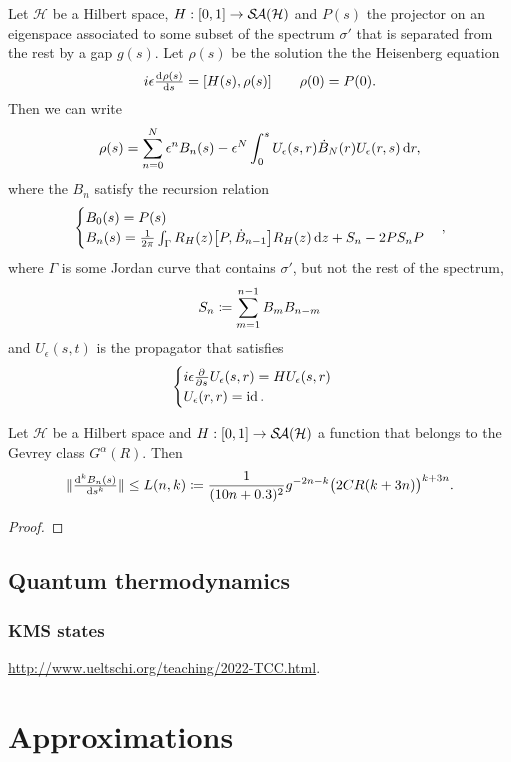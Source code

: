 \begin{proposition}
Let $\mathcal{H}$ be a Hilbert space, $H: \interval{0,1}\to \SelfAdjoints(\mathcal{H})$ and $P(s)$ the projector on an eigenspace associated to some subset of the spectrum $\sigma'$ that is separated from the rest by a gap $g(s)$. Let $\rho(s)$ be the solution the the Heisenberg equation
\[ i\epsilon \od{\rho(s)}{s} = [H(s), \rho(s)] \qquad \rho(0)= P(0). \]
Then we can write
\[ \rho(s) = \sum_{n=0}^N \epsilon^nB_n(s) - \epsilon^N\int_0^s U_\epsilon(s,r)\dot{B}_N(r)U_\epsilon(r,s) \operatorname{d \!}{r}, \]
where the $B_n$ satisfy the recursion relation
\[ \begin{cases}
B_0(s) = P(s) \\
B_n(s) = \frac{1}{2\pi}\int_\Gamma R_H(z)\big[P, \dot{B}_{n-1}\big]R_H(z) \operatorname{d \!}{z} + S_n - 2PS_nP
\end{cases}, \]
where $\Gamma$ is some Jordan curve that contains $\sigma'$, but not the rest of the spectrum,
\[ S_n \coloneqq \sum_{m=1}^{n-1}B_mB_{n-m} \]
and $U_\epsilon(s,t)$ is the propagator that satisfies
\[ \begin{cases}
i\epsilon  \frac{\partial{^{}}}{\partial{{s}^{}}} U_\epsilon(s,r) = HU_\epsilon(s,r) \\
U_\epsilon(r,r) = \operatorname{id}.
\end{cases} \]
\end{proposition}

\begin{lemma}
Let $\mathcal{H}$ be a Hilbert space and $H: \interval{0,1}\to \SelfAdjoints(\mathcal{H})$ a function that belongs to the Gevrey class $G^\alpha(R)$. Then
\[ \norm{\od[k]{B_n(s)}{s}} \leq L(n,k) \defeq \frac{1}{(10n + 0.3)^2}g^{-2n-k}\big(2CR(k+3n)\big)^{k+3n}. \]
\end{lemma}
\begin{proof}

\end{proof}

\section{Quantum thermodynamics}
\subsection{KMS states}
\url{http://www.ueltschi.org/teaching/2022-TCC.html}.

\chapter{Approximations}
